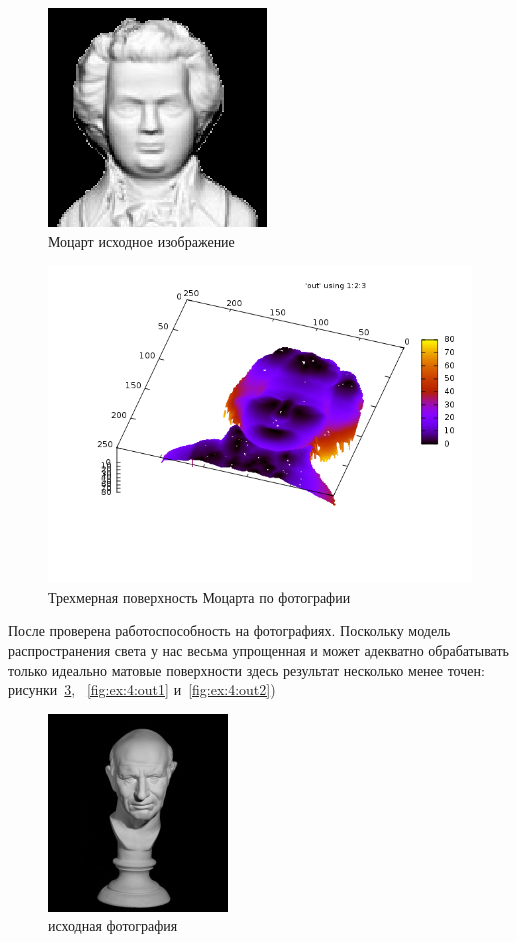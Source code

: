 \documentclass[a4paper,12pt]{article}
\begin{document}
\begin{figure}[H]
  \centering
  \includegraphics[width=0.5\linewidth]{img/mozart_in.png}
  \hfil \caption{Моцарт исходное изображение}
  \label{fig:ex:3:in}
\end{figure}

\begin{figure}[H]
  \centering
  \includegraphics[width=0.5\linewidth]{img/mozart.png}
  \hfil \caption{Трехмерная поверхность Моцарта по фотографии}
  \label{fig:ex:3:out}
\end{figure}

После проверена работоспособность на фотографиях. Поскольку модель
распространения света у нас весьма упрощенная и может адекватно
обрабатывать только идеально матовые поверхности здесь результат
несколько менее точен: рисунки~\ref{fig:ex:4:in}, ~\ref{fig:ex:4:out1}
и~\ref{fig:ex:4:out2})

\begin{figure}[H]
  \centering
  \includegraphics[width=0.5\linewidth]{img/man_in.jpg}
  \hfil \caption{исходная фотография}
  \label{fig:ex:4:in}
\end{figure}
\end{document}
